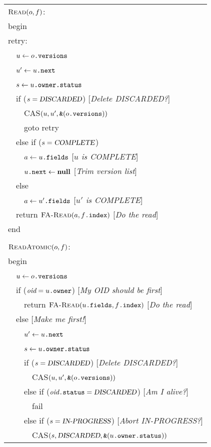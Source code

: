\documentclass[preprint]{rdbacmconf}
\newcommand{\funcname}[1]{\ensuremath{\text{\sc #1}}}
\newcommand{\var}[1]{\ensuremath{\text{\it #1}}}
\newcommand{\fref}[2]{\ensuremath{#1\text{\tt .#2}}}
\newcommand{\addr}[1]{\ensuremath{\text{\tt \&}(#1)}}
\begin{document}
\begin{figure}[p]
\renewcommand{\>}{~~}
\newcommand{\com}[1]{\hfill [{\sl #1}]}
\begin{tabular}{l}
$\funcname{Read}(o, f)$:\\
begin\\
retry:\\
\>$u \gets \fref{o}{versions}$ \\
\>$u' \gets \fref{u}{next}$ \\
\>$s  \gets \fref{\fref{u}{owner}}{status}$ \\
\>if ($s=\text{\sl DISCARDED}$) \com{Delete DISCARDED?}\\
\>\>CAS$(u, u', \addr{\fref{o}{versions}})$\\
\>\>goto retry \\
\>else if ($s=\text{\sl COMPLETE}$)\\
\>\>$a \gets \fref{u}{fields}$ \com{$u$ is COMPLETE}\\
\>\>$\fref{u}{next} \gets \text{\bf null}$ \com{Trim version list}\\
\>else\\
\>\>$a \gets \fref{u'}{fields}$ \com{$u'$ is COMPLETE}\\
\>return $\funcname{FA-Read}(a, \fref{f}{index})$ \com{Do the read}\\
end\\
\\
$\funcname{ReadAtomic}(o, f)$:\\
begin\\
\>$u \gets \fref{o}{versions}$\\
\>if ($\var{oid} = \fref{u}{owner}$) \com{My OID should be first}\\
\>\>return $\funcname{FA-Read}(\fref{u}{fields}, \fref{f}{index})$
\com{Do the read}\\
\>else \com{Make me first!}\\
\>\>$u' \gets \fref{u}{next}$\\
\>\>$s  \gets \fref{\fref{u}{owner}}{status}$\\
\>\>if ($s=\text{\sl DISCARDED}$) \com{Delete DISCARDED?}\\
\>\>\>CAS$(u, u', \addr{\fref{o}{versions}})$\\
\>\>else if ($\fref{\var{oid}}{status}=\text{\sl DISCARDED}$)
\com{Am I alive?}\\
\>\>\>fail\\
\>\>else if ($s=\text{\sl IN-PROGRESS}$) \com{Abort IN-PROGRESS?}\\
\>\>\>CAS$(s, \text{\sl DISCARDED}, \addr{\fref{\fref{u}{owner}}{status}})$\\

\end{tabular}
\end{figure}
\end{document}
